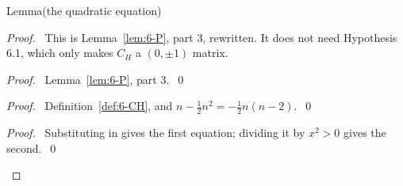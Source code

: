 \begin{namedresult}{Lemma}{(the quadratic equation)}\label{lem:6-quadratic}
 \prove{\[
  (xC_H+nI)\bigl(xC_H-\tfrac12n(n-2)I\bigr)=0,\qquad
  (C_H+dI)\bigl(C_H-\tfrac12d(n-2)I\bigr)=0.
 \]}
\end{namedresult}
\begin{proof}
 \pfsketch\ This is Lemma~\ref{lem:6-P}, part 3, rewritten. It does not need Hypothesis 6.1,
 which only makes $C_H$ a $(0,\pm1)$ matrix.
 \begin{proof}\pf\ Lemma~\ref{lem:6-P}, part 3.~\qed\end{proof}
 \begin{proof}\pf\ Definition~\ref{def:6-CH}, and $n-\frac12n^2=-\frac12n(n-2)$.~\qed\end{proof}
 \qedstep
 \begin{proof}\pf\ Substituting  in  gives the first equation;
  dividing it by $x^2>0$ gives the second.~\qed\end{proof}
\end{proof}


